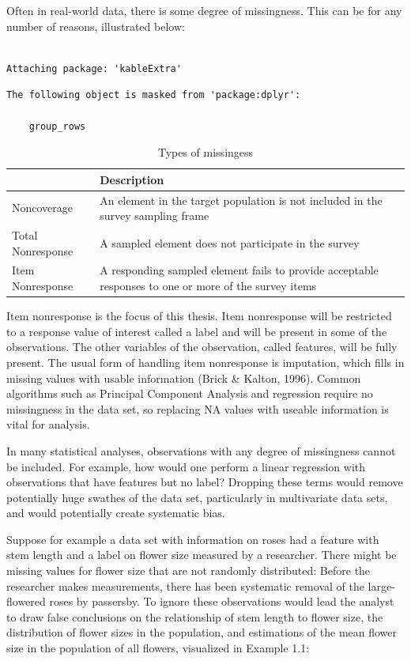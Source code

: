 \documentclass[12pt,twoside]{reedthesis}
\begin{document}
Often in real-world data, there is some degree of missingness. This can
be for any number of reasons, illustrated below:
\begin{verbatim}

Attaching package: 'kableExtra'
\end{verbatim}
\begin{verbatim}
The following object is masked from 'package:dplyr':

    group_rows
\end{verbatim}
\begin{table}[t]

\caption{\label{tab:missingness}Types of missingess}
\centering
\begin{tabular}{l|l}
\hline
  & Description\\
\hline
Noncoverage & An element in the target population is not included in the survey sampling frame\\
\hline
Total Nonresponse & A sampled element does not participate in the survey\\
\hline
Item Nonresponse & A responding sampled element fails to provide acceptable responses to one or more of the survey items\\
\hline
\end{tabular}
\end{table}
Item nonresponse is the focus of this thesis. Item nonresponse will be
restricted to a response value of interest called a label and will be
present in some of the observations. The other variables of the
observation, called features, will be fully present. The usual form of
handling item nonresponse is imputation, which fills in missing values
with usable information (Brick \& Kalton, 1996). Common algorithms such
as Principal Component Analysis and regression require no missingness in
the data set, so replacing NA values with useable information is vital
for analysis.

In many statistical analyses, observations with any degree of
missingness cannot be included. For example, how would one perform a
linear regression with observations that have features but no label?
Dropping these terms would remove potentially huge swathes of the data
set, particularly in multivariate data sets, and would potentially
create systematic bias.

Suppose for example a data set with information on roses had a feature
with stem length and a label on flower size measured by a researcher.
There might be missing values for flower size that are not randomly
distributed: Before the researcher makes measurements, there has been
systematic removal of the large-flowered roses by passersby. To ignore
these observations would lead the analyst to draw false conclusions on
the relationship of stem length to flower size, the distribution of
flower sizes in the population, and estimations of the mean flower size
in the population of all flowers, visualized in Example 1.1:
\end{document}
